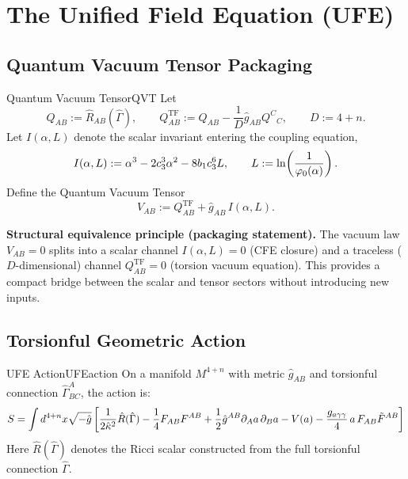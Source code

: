 \section{The Unified Field Equation (UFE)}

\subsection{Quantum Vacuum Tensor Packaging}

\begin{definition}{Quantum Vacuum Tensor}{QVT}
Let
\begin{equation}
Q_{AB} := \hat{R}_{AB}(\hat{\Gamma}),
\qquad
Q^{\mathrm{TF}}_{AB} := Q_{AB} - \frac{1}{D}\hat{g}_{AB} Q^{C}{}_{C},
\qquad D:=4+n.
\end{equation}
Let $I(\alpha,L)$ denote the scalar invariant entering the coupling equation,
\begin{equation}
I(\alpha,L) := \alpha^3 - 2c_3^3\alpha^2 - 8 b_1 c_3^6 L,
\qquad L := \ln\!\left(\frac{1}{\varphi_0(\alpha)}\right).
\end{equation}
Define the Quantum Vacuum Tensor
\begin{equation}
V_{AB} := Q^{\mathrm{TF}}_{AB} + \hat{g}_{AB}\, I(\alpha,L).
\end{equation}

\tcblower
\textbf{Structural equivalence principle (packaging statement).}
The vacuum law $V_{AB}=0$ splits into a scalar channel $I(\alpha,L)=0$ (CFE closure)
and a traceless ($D$-dimensional) channel $Q^{\mathrm{TF}}_{AB}=0$ (torsion vacuum equation).
This provides a compact bridge between the scalar and tensor sectors without introducing new inputs.
\end{definition}

\subsection{Torsionful Geometric Action}

\begin{definition}{UFE Action}{UFEaction}
On a manifold $M^{4+n}$ with metric $\hat{g}_{AB}$ and torsionful connection 
$\hat{\Gamma}^A_{BC}$, the action is:
\begin{equation}
    S = \int d^{4+n}x\sqrt{-\hat{g}}\left[
        \frac{1}{2\hat{\kappa}^2}\hat{R}(\hat{\Gamma}) 
        - \frac{1}{4}F_{AB}F^{AB}
        + \frac{1}{2}\hat{g}^{AB}\partial_A a\,\partial_B a 
        - V(a) 
        - \frac{g_{a\gamma\gamma}}{4}\, a\, F_{AB}\tilde{F}^{AB}
    \right]
\end{equation}
Here $\hat{R}(\hat{\Gamma})$ denotes the Ricci scalar constructed from the full torsionful connection $\hat{\Gamma}$.
\end{definition}

